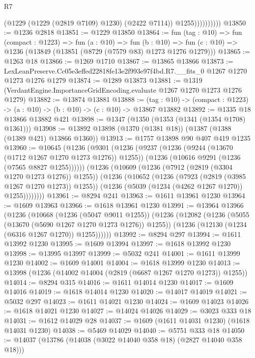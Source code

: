 \begin{lexlean}{R7}
\begin{coremodule}
                        (@1229 (@1229 (@2819 @7109) @1230) (@2422 @7114))
                        @1255))))))))))
@13850 := @1236 @2818
@13851 := @1229 @13850
@13864 := fun (tag : @10) =>
  fun (compact : @1223) =>
  fun (a : @10) =>
  fun (b : @10) => fun (c : @10) => @1236 (@13849 (@13851 (@8729 (@7579 @83) @1273 @1276 @1279)))
@13865 := @1263 @18
@13866 := @1269 @1710
@13867 := @13865 @13866
@13873 := LexLeanPreserve.Cc05e3effed22818fe13e2f993e97f4bd.R7.__fits_0
    @1267
    @1270
    @1273
    @1276
    @1279
@13874 := @1289 @13873
@13881 := @1319 (VerdantEngine.ImportanceGridEncoding.evaluate @1267 @1270 @1273 @1276 @1279)
@13882 := @13874 @13881
@13888 := (tag : @10) -> (compact : @1223) -> (a : @10) -> (b : @10) -> (c : @10) -> @13867 @13882
@13892 := @1335 @18 @13866 @13882 @421
@13898 := @1347 (@1350 (@1353 (@1341 (@1354 @1708) @1361)))
@13908 := @13892 @13898 (@1370 (@1381 @18)) (@1387 (@1388 (@1389 @421) @13866 @1360))
@13913 := @1757 @13898 @90 @407 @419 @1235
@13960 := @10645
    (@1236
      (@9301
        (@1236
          (@9237
            (@1236 (@9244 (@13670 (@1712 @1267 @1270 @1273 @1276)) @1255))
            (@1236 (@10616 @9291 (@1236 (@7565 @8827 @1255))))))
        (@1236
          (@10609
            (@1236 (@7912 (@2819 (@3304 @1270 @1273 @1276)) @1255))
            (@1236
              (@10652
                (@1236 (@7923 (@2819 (@3985 @1267 @1270 @1273)) @1255))
                (@1236 (@5039 (@1234 (@4262 @1267 @1270)) @1255))))))))
@13961 := @8294 @241
@13963 := @1611 @13961 @1230
@13964 := @1609 @13963
@13966 := @1618 @13961 @1230
@13991 := @13964
    @13966
    (@1236
      (@10668
        (@1236 (@5047 @9011 @1255))
        (@1236
          (@12082
            (@1236 (@5055 (@13670 (@5690 @1267 @1270 @1273 @1276)) @1255))
            (@1236 (@12130 (@1234 (@6316 @1267 @1270)) @1255))))))
@13992 := @8294 @297
@13994 := @1611 @13992 @1230
@13995 := @1609 @13994
@13997 := @1618 @13992 @1230
@13998 := @13995 @13997
@13999 := @5032 @241
@14001 := @1611 @13999 @1230
@14002 := @1609 @14001
@14004 := @1618 @13999 @1230
@14013 := @13998 (@1236 (@14002 @14004 (@2819 (@6687 @1267 @1270 @1273)) @1255))
@14014 := @8294 @315
@14016 := @1611 @14014 @1230
@14017 := @1609 @14016
@14019 := @1618 @14014 @1230
@14020 := @14017 @14019
@14021 := @5032 @297
@14023 := @1611 @14021 @1230
@14024 := @1609 @14023
@14026 := @1618 @14021 @1230
@14027 := @14024 @14026
@14029 := @3023 @333 @18
@14031 := @1612 @14029 @28
@14037 := @1609 (@1611 @14031 @1230) (@1618 @14031 @1230)
@14038 := @5469 @14029
@14040 := @5751 @333 @18
@14050 := @14037 (@13786 (@14038 (@3022 @14040 @358 @18) (@2827 @14040 @358 @18)))

\end{coremodule}
\end{lexlean}
